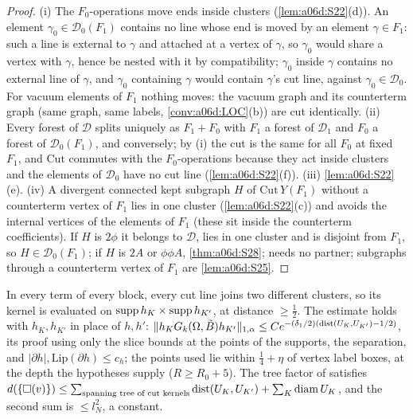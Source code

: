 \begin{proof}
(i) The $F_0$-operations move ends inside clusters (\cref{lem:a06d:S22}(d)). An element $\gamma_0\in\mathcal D_0(F_1)$ contains no line whose end is moved by an element $\gamma\in F_1$: such a line is external to $\gamma$ and attached at a vertex of $\gamma$, so $\gamma_0$ would share a vertex with $\gamma$, hence be nested with it by compatibility; $\gamma_0$ inside $\gamma$ contains no external line of $\gamma$, and $\gamma_0$ containing $\gamma$ would contain $\gamma$'s cut line, against $\gamma_0\in\mathcal D_0$. For vacuum elements of $F_1$ nothing moves: the vacuum graph and its counterterm graph (same graph, same labels, \cref{conv:a06d:LOC}(b)) are cut identically. (ii) Every forest of $\mathcal D$ splits uniquely as $F_1+F_0$ with $F_1$ a forest of $\mathcal D_1$ and $F_0$ a forest of $\mathcal D_0(F_1)$, and conversely; by (i) the cut is the same for all $F_0$ at fixed $F_1$, and $\mathrm{Cut}$ commutes with the $F_0$-operations because they act inside clusters and the elements of $\mathcal D_0$ have no cut line (\cref{lem:a06d:S22}(f)). (iii) \cref{lem:a06d:S22}(e). (iv) A divergent connected kept subgraph $H$ of $\mathrm{Cut}\,Y(F_1)$ without a counterterm vertex of $F_1$ lies in one cluster (\cref{lem:a06d:S22}(c)) and avoids the internal vertices of the elements of $F_1$ (these sit inside the counterterm coefficients). If $H$ is $2\phi$ it belongs to $\mathcal D$, lies in one cluster and is disjoint from $F_1$, so $H\in\mathcal D_0(F_1)$; if $H$ is $2A$ or $\phi\phi A$, \cref{thm:a06d:S28}; \cite[(2.4)]{Ba3} needs no partner; subgraphs through a counterterm vertex of $F_1$ are \cref{lem:a06d:S25}.
\end{proof}

\begin{corollary}\label{cor:a06d:S24}
In every term of every block, every cut line joins two different clusters, so its kernel is evaluated on $\operatorname{supp} h_K\times\operatorname{supp} h_{K'}$, at distance $\ge\frac12$. The estimate \cite[(3.1)]{Ba3} holds with $h_K,h_{K'}$ in place of $h,h'$: $\lVert h_KG_k(\Omega,\tilde B)h_{K'}\rVert_{1,\alpha}\le Ce^{-(\delta_1/2)(\operatorname{dist}(U_K,U_{K'})-1/2)}$, its proof using only the slice bounds at the points of the supports, the separation, and $|\partial h|,\mathrm{Lip}(\partial h)\le c_h$; the points used lie within $\frac14+\eta$ of vertex label boxes, at the depth the hypotheses supply ($R\ge R_0+5$). The tree factor of \cite[(1.33)]{Ba3} satisfies $d(\{\square(v)\})\le\sum_{\text{spanning tree of cut kernels}}\operatorname{dist}(U_K,U_{K'})+\sum_K\operatorname{diam}U_K$, and the second sum is $\le l_N^2$, a constant.
\end{corollary}

